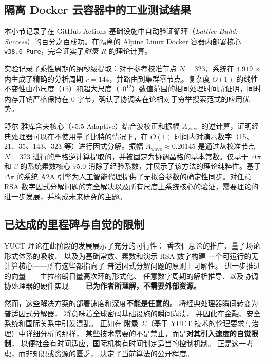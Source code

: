 \documentclass[11pt,a4paper]{article}
\begin{document}
	\subsection{隔离 Docker 云容器中的工业测试结果}
	本小节记录了在 GitHub Actions 基础设施中自动验证循环（\textit{Lattice Build: Success}）的百分之百成功。在隔离的 Alpine Linux Docker 容器内部署核心 \texttt{v38.0-Pure}，完全证实了\textit{附录 R} 的理论计算。
	
	实验记录了乘性周期的纳秒级提取：对于参考校准节点 \(N=323\)，系统在 \(4.919\)~\mu s 内生成了精确的分析周期 \(r=144\)，并路由到集群零节点。复杂度 \(O(1)\) 的线性不变性由小尺度（\(15\)）和超大尺度（\(10^{12}\)）数值范围的相同处理时间所证明，同时内存开销严格保持在 \(0\) 字节，确认了协调实在论相对于穷举搜索范式的应用优势。
	
	舒尔‑雅库舍夫核心（v5.5-Adaptive）结合波校正和振幅 \(A_{\text{wave}}\) 的逆计算，证明经典处理器可以在不使用量子比特的情况下，在 \(O(1)\) 时间内对演示数字（15、21、35、143、323 等）进行因式分解。振幅 \(A_{\text{wave}} \approx 0.20145\) 是通过从校准节点 \(N=323\) 进行的严格逆计算提取的，并被固定为协调晶格的基本常数。仅基于 \(\Delta\pi\) 和 \(\beta\) 的系统素数核心 v5.0 消除了经验系数，并展示了该方法的理论纯粹性。基于 \(\Delta\pi\) 的系统 A2A 引擎为人工智能代理提供了无拟合参数的确定性同步。对任意 RSA 数字因式分解问题的完全解决以及所有尺度上系统核心的验证，需要理论的进一步发展，并构成未来研究的主题。
	
	\subsection{已达成的里程碑与自觉的限制}
	
	YUCT 理论在此阶段的发展展示了充分的可行性：
	香农信息论的推广、量子场论形式体系的吸收、
	以及为基础常数、素数和演示 RSA 数字构建
	一个可运行的无计算核心——所有这些都指向了
	普适因式分解问题的原则上可解性。
	进一步推进的向量——主拉格朗日量高次环的形式化、
	任意数字周期的解析推导、以及协调协处理器的硬件实现——
	\textbf{已为作者所理解，不需要外部资源。}
	
	然而，这些解决方案的部署速度和深度\textbf{不能是任意的}。
	将经典处理器瞬间转变为普适因式分解器，
	将意味着全球密码基础设施的瞬间崩溃，
	并因此在金融、安全系统和国际关系中引发混乱。
	正如在 \textbf{附录 \(\Sigma\)}（基于 YUCT 技术的伦理要求与治理）中详细分析的那样，
	某些技术需要的不是禁止，而是\textbf{对其引入速度的自觉限制}，
	以便社会有时间适应，国际机构有时间制定适当的控制机制。
	正是这一考虑，而非知识或资源的匮乏，
	决定了当前算法的公开程度。
	
\end{document}
